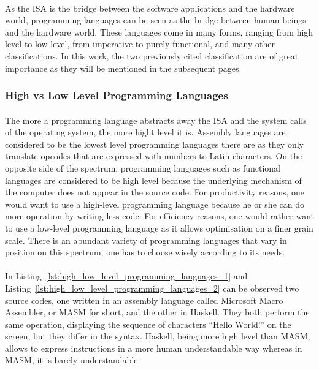 \paragraph{}
As the ISA is the bridge between the software applications and the hardware world, programming languages can be seen as the bridge between human beings and the hardware world. These languages come in many forms, ranging from high level to low level, from imperative to purely functional, and many other classifications. In this work, the two previously cited classification are of great importance as they will be mentioned in the subsequent pages.

\subsubsection{High vs Low Level Programming Languages} \label{sec:high_vs_low_level_programming_languages}
\paragraph{}
The more a programming language abstracts away the ISA and the system calls of the operating system, the more hight level it is. Assembly languages are considered to be the lowest level programming languages there are as they only translate opcodes that are expressed with numbers to Latin characters. On the opposite side of the spectrum, programming languages such as functional languages are considered to be high level because the underlying mechanism of the computer does not appear in the source code. For productivity reasons, one would want to use a high-level programming language because he or she can do more operation by writing less code. For efficiency reasons, one would rather want to use a low-level programming language as it allows optimisation on a finer grain scale. There is an abundant variety of programming languages that vary in position on this spectrum, one has to choose wisely according to its needs.

\paragraph{}
In Listing~\ref{lst:high_low_level_programming_languages_1} and Listing~\ref{lst:high_low_level_programming_languages_2} can be observed two source codes, one written in an assembly language called Microsoft Macro Assembler, or MASM for short, and the other in Haskell. They both perform the same operation, displaying the sequence of characters “Hello World!” on the screen, but they differ in the syntax. Haskell, being more high level than MASM, allows to express instructions in a more human understandable way whereas in MASM, it is barely understandable. \\ \\


